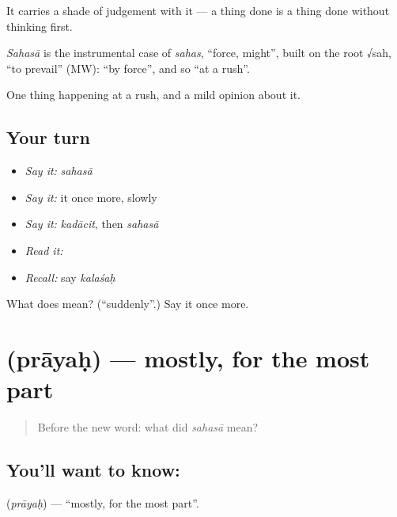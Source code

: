 It carries a shade of judgement with it — a thing done \textbf{} is a thing done without thinking first.

\begin{cousinweb}
\emph{Sahasā} is the instrumental case of \emph{sahas}, \textquotedblleft{}force, might\textquotedblright{}, built on the root √sah, \textquotedblleft{}to prevail\textquotedblright{} (MW): \textquotedblleft{}by force\textquotedblright{}, and so \textquotedblleft{}at a rush\textquotedblright{}.
\end{cousinweb}

\begin{grammarlens}[title={What you've built}]
One thing happening at a rush, and a mild opinion about it.
\end{grammarlens}

\subsection*{Your turn}
\begin{itemize}
\raggedright
  \item \emph{Say it:} \emph{sahasā}
  \item \emph{Say it:} it once more, slowly
  \item \emph{Say it:} \emph{kadācit}, then \emph{sahasā}
  \item \emph{Read it:} \textbf{}
  \item \emph{Recall:} say \emph{kalaśaḥ}
\end{itemize}

\begin{tcolorbox}[breakable,colback=teal!4,colframe=teal!35!black,title={Before you move on}]
What does  mean? (\textquotedblleft{}suddenly\textquotedblright{}.) Say it once more.
\end{tcolorbox}
\section[\texorpdfstring{\sk{प्रायः} (prāyaḥ)}{प्रायः (prāyaḥ)}]{ (prāyaḥ) — mostly, for the most part}

\label{lesson:SA-C42-mostly}



\begin{quote}
Before the new word: what did \emph{sahasā} mean?
\end{quote}

\subsection*{You'll want to know: }
\textbf{} (\emph{prāyaḥ}) — \textquotedblleft{}mostly, for the most part\textquotedblright{}.

